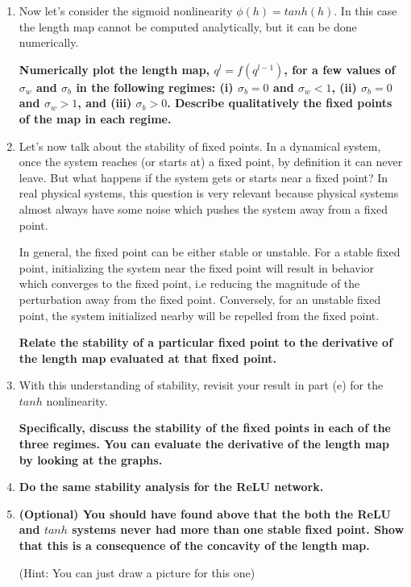 \documentclass[a4paper]{article}
\begin{document}
\begin{enumerate}[label=(\alph*)]
\item Now let's consider the sigmoid nonlinearity $\phi(h) = tanh(h)$.  In this case the length map cannot be computed analytically, but it can be done numerically.  

\textbf{Numerically plot the length map, $q^l=f(q^{l-1})$, for a few values of $\sigma_w$ and $\sigma_b$ in the following regimes: (i) $\sigma_b=0$ and $\sigma_w < 1$, (ii) $\sigma_b = 0$ and $\sigma_w > 1$, and (iii) $\sigma_b > 0$.  Describe qualitatively the fixed points of the map in each regime.}

\item Let’s now talk about the stability of fixed points. In a dynamical system, once the system reaches (or starts at) a fixed point, by definition it can never leave. But what happens if the system gets or starts near a fixed point?  In real physical systems, this question is very relevant because physical systems almost always have some noise which pushes the system away from a fixed point.  

In general, the fixed point can be either stable or unstable.  For a stable fixed point, initializing the system near the fixed point will result in behavior which converges to the fixed point, i.e reducing the magnitude of the perturbation away from the fixed point.  Conversely, for an unstable fixed point, the system initialized nearby will be repelled from the fixed point.  

\textbf{Relate the stability of a particular fixed point to the derivative of the length map evaluated at that fixed point.}

\item With this understanding of stability, revisit your result in part (e) for the $tanh$ nonlinearity.

\textbf{Specifically, discuss the stability of the fixed points in each of the three regimes.  You can evaluate the derivative of the length map by looking at the graphs.}

\item \textbf{Do the same stability analysis for the ReLU network.} 

\item \textbf{(Optional) You should have found above that the both the ReLU and $tanh$ systems never had more than one stable fixed point.  Show that this is a consequence of the concavity of the length map.}

(Hint: You can just draw a picture for this one)

\end{enumerate}
\end{document}
